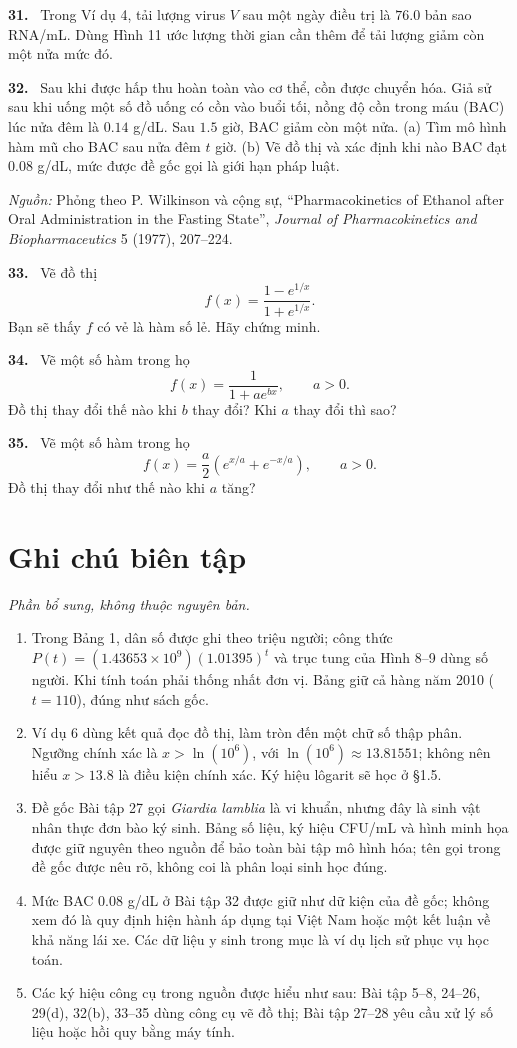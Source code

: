 \documentclass[12pt,a4paper]{article}
\newcommand{\bt}[1]{\par\smallskip\noindent\textbf{#1.}\ }
\begin{document}
\bt{31} Trong Ví dụ 4, tải lượng virus $V$ sau một ngày điều trị là $76.0$ bản sao RNA/mL. Dùng Hình 11 ước lượng thời gian cần thêm để tải lượng giảm còn một nửa mức đó.
\bt{32} Sau khi được hấp thu hoàn toàn vào cơ thể, cồn được chuyển hóa. Giả sử sau khi uống một số đồ uống có cồn vào buổi tối, nồng độ cồn trong máu (BAC) lúc nửa đêm là $0.14$ g/dL. Sau $1.5$ giờ, BAC giảm còn một nửa. (a) Tìm mô hình hàm mũ cho BAC sau nửa đêm $t$ giờ. (b) Vẽ đồ thị và xác định khi nào BAC đạt $0.08$ g/dL, mức được đề gốc gọi là giới hạn pháp luật.

\noindent\textit{Nguồn:} Phỏng theo P. Wilkinson và cộng sự, ``Pharmacokinetics of Ethanol after Oral Administration in the Fasting State'', \textit{Journal of Pharmacokinetics and Biopharmaceutics} 5 (1977), 207–224.
\bt{33} Vẽ đồ thị
\[f(x)=\frac{1-e^{1/x}}{1+e^{1/x}}.\]
Bạn sẽ thấy $f$ có vẻ là hàm số lẻ. Hãy chứng minh.
\bt{34} Vẽ một số hàm trong họ
\[f(x)=\frac1{1+ae^{bx}},\qquad a>0.\]
Đồ thị thay đổi thế nào khi $b$ thay đổi? Khi $a$ thay đổi thì sao?
\bt{35} Vẽ một số hàm trong họ
\[f(x)=\frac a2\left(e^{x/a}+e^{-x/a}\right),\qquad a>0.\]
Đồ thị thay đổi như thế nào khi $a$ tăng?

\clearpage
\section*{Ghi chú biên tập}
\noindent\textit{Phần bổ sung, không thuộc nguyên bản.}
\begin{enumerate}[leftmargin=*,itemsep=5pt]
\item Trong Bảng 1, dân số được ghi theo triệu người; công thức $P(t)=(1.43653\times10^9)(1.01395)^t$ và trục tung của Hình 8–9 dùng số người. Khi tính toán phải thống nhất đơn vị. Bảng giữ cả hàng năm 2010 ($t=110$), đúng như sách gốc.
\item Ví dụ 6 dùng kết quả đọc đồ thị, làm tròn đến một chữ số thập phân. Ngưỡng chính xác là $x>\ln(10^6)$, với $\ln(10^6)\approx13.81551$; không nên hiểu $x>13.8$ là điều kiện chính xác. Ký hiệu lôgarit sẽ học ở §1.5.
\item Đề gốc Bài tập 27 gọi \textit{Giardia lamblia} là vi khuẩn, nhưng đây là sinh vật nhân thực đơn bào ký sinh. Bảng số liệu, ký hiệu CFU/mL và hình minh họa được giữ nguyên theo nguồn để bảo toàn bài tập mô hình hóa; tên gọi trong đề gốc được nêu rõ, không coi là phân loại sinh học đúng.
\item Mức BAC $0.08$ g/dL ở Bài tập 32 được giữ như dữ kiện của đề gốc; không xem đó là quy định hiện hành áp dụng tại Việt Nam hoặc một kết luận về khả năng lái xe. Các dữ liệu y sinh trong mục là ví dụ lịch sử phục vụ học toán.
\item Các ký hiệu công cụ trong nguồn được hiểu như sau: Bài tập 5–8, 24–26, 29(d), 32(b), 33–35 dùng công cụ vẽ đồ thị; Bài tập 27–28 yêu cầu xử lý số liệu hoặc hồi quy bằng máy tính.
\end{enumerate}
\end{document}
